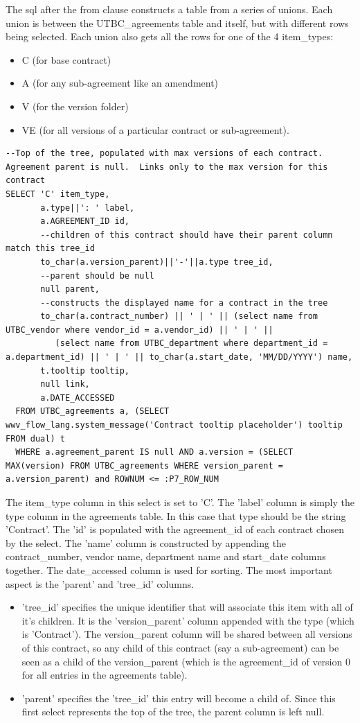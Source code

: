 \documentclass{report}
\begin{document}
The sql after the from clause constructs a table from a series of unions.  Each union is between the UTBC\_agreements table and itself, but with different rows being selected.  Each union also gets all the rows for one of the 4 item\_types: 
\begin{itemize}
	\item C  (for base contract)
	\item A  (for any sub-agreement like an amendment)
	\item V  (for the version folder)
	\item VE (for all versions of a particular contract or sub-agreement).
\end{itemize}
\begin{lstlisting}[caption=Selecting the max version of each contract in the agreements table.]
--Top of the tree, populated with max versions of each contract.  Agreement parent is null.  Links only to the max version for this contract
SELECT 'C' item_type,
       a.type||': ' label,
       a.AGREEMENT_ID id,
       --children of this contract should have their parent column match this tree_id
       to_char(a.version_parent)||'-'||a.type tree_id,
       --parent should be null
       null parent,
       --constructs the displayed name for a contract in the tree
       to_char(a.contract_number) || ' | ' || (select name from UTBC_vendor where vendor_id = a.vendor_id) || ' | ' ||
          (select name from UTBC_department where department_id = a.department_id) || ' | ' || to_char(a.start_date, 'MM/DD/YYYY') name, 
       t.tooltip tooltip,
       null link,
       a.DATE_ACCESSED
  FROM UTBC_agreements a, (SELECT wwv_flow_lang.system_message('Contract tooltip placeholder') tooltip FROM dual) t
  WHERE a.agreement_parent IS null AND a.version = (SELECT MAX(version) FROM UTBC_agreements WHERE version_parent = a.version_parent) and ROWNUM <= :P7_ROW_NUM
\end{lstlisting}
The item\_type column in this select is set to 'C'.  The 'label' column is simply the type column in the agreements table.  In this case that type should be the string 'Contract'.  The 'id' is populated with the agreement\_id of each contract chosen by the select.  The 'name' column is constructed by appending the contract\_number, vendor name, department name and start\_date columns together.  The date\_accessed column is used for sorting.  The most important aspect is the 'parent' and 'tree\_id' columns.
\begin{itemize}
	\item 'tree\_id' specifies the unique identifier that will associate this item with all of it's children.  It is the 'version\_parent' column appended with the type (which is 'Contract').  The version\_parent column will be shared between all versions of this contract, so any child of this contract (say a sub-agreement) can be seen as a child of the version\_parent (which is the agreement\_id of version 0 for all entries in the agreements table).
	\item 'parent' specifies the 'tree\_id' this entry will become a child of.  Since this first select represents the top of the tree, the parent column is left null.
\end{itemize}
\end{document}
